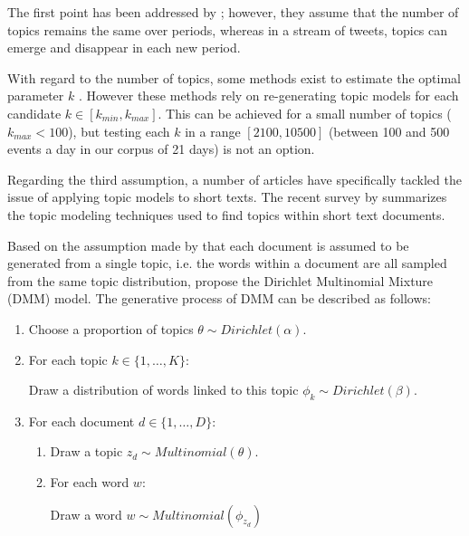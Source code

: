 	The first point has been addressed by \citet{blei_dynamic_2006}; however, they assume that the number of topics remains the same over periods, whereas in a stream of tweets, topics can emerge and disappear in each new period.
	
	With regard to the number of topics, some methods exist to estimate the optimal parameter $k$  \citep{brunet_metagenes_2004,griffiths_finding_2004,arun_finding_2010,greene_how_2014}. However these methods rely on re-generating topic models for each candidate $k \in [k_{min}, k_{max}]$. This can be achieved for a small number of topics ($k_{max} < 100$), but testing each $k$ in a range $[2100, 10500]$ (between 100 and 500 events a day in our corpus of 21 days) is not an option. 
	
	Regarding the third assumption, a number of articles have specifically tackled the issue of applying topic models to short texts. The recent survey by \citet{likhitha975detailed} summarizes the topic modeling techniques used to find topics within short text documents.
    
    Based on the assumption made by \citet{nigam2000text} that each document is assumed to be generated from a single topic, i.e. the words within a document are all sampled from the same topic distribution, \citet{yin_dirichlet_2014} propose the Dirichlet Multinomial Mixture (DMM) model. The generative process of DMM can be described as follows: 
    \begin{center}
        	\begin{enumerate}
	 	\item Choose a proportion of topics $\theta \sim Dirichlet(\alpha)$.
	 	\item For each topic $k \in \lbrace1,\ldots,K\rbrace$:
	 	 
			Draw a distribution of words linked to this topic $\phi_k \sim Dirichlet(\beta)$.
		\item For each document $d \in \lbrace1,\ldots,D\rbrace$:
		\begin{enumerate}
		    \item Draw a topic $z_d \sim Multinomial(\theta)$.
		    \item For each word $w$:
		    
		    Draw a word $w \sim Multinomial(\phi_{z_d})$
		    
		\end{enumerate}	 	  
	 \end{enumerate}
    \end{center}

